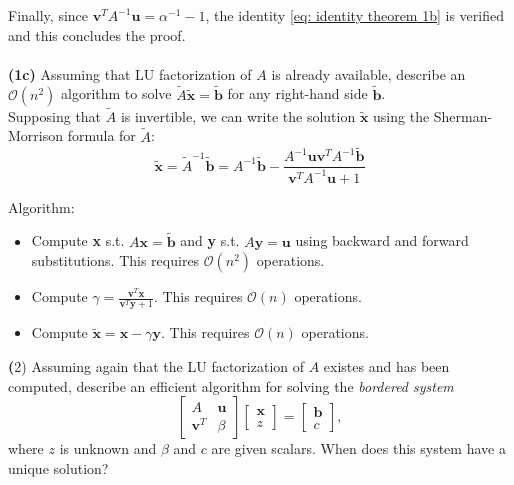 \documentclass[a4paper]{report}
\numberwithin{equation}{chapter}
\begin{document}
Finally, since $\textbf{v}^T A^{-1} \textbf{u} = \alpha^{-1} - 1$, the identity \eqref{eq: identity theorem 1b} is verified and this concludes the proof.\\
\\
\textbf{(1c)} Assuming that LU factorization of $A$ is already available, describe an $\mathcal{O}(n^2)$ algorithm to solve $\tilde{A} \tilde{\textbf{x}} = \tilde{\textbf{b}}$ for any right-hand side $\tilde{\textbf{b}}$.\\
Supposing that $\tilde{A}$ is invertible, we can write the solution $\tilde{\textbf{x}}$ using the Sherman-Morrison formula for $\tilde{A}$:
\begin{equation}\label{key}
	\tilde{\textbf{x}} = \tilde{A}^{-1} \tilde{\textbf{b}} =  A^{-1} \tilde{\textbf{b}}  - \frac{A^{-1}\textbf{u}\textbf{v}^T A^{-1}\tilde{\textbf{b}} }{\textbf{v}^T A^{-1} \textbf{u} + 1 }
\end{equation}

\noindent Algorithm: 
\begin{itemize}
	\item Compute \textbf{x} s.t. $A\textbf{x} = \tilde{\textbf{b}}$ and \textbf{y} s.t. $A\textbf{y} = \textbf{u}$ using backward and forward substitutions. This requires $\mathcal{O}(n^2)$ operations.
	\item Compute $\gamma = \frac{\textbf{v}^T \textbf{x}}{\textbf{v}^T \textbf{y} + 1}$. This requires $\mathcal{O}(n)$ operations.
	\item Compute $\tilde{\textbf{x}} = \textbf{x} - \gamma \textbf{y}$. This requires $\mathcal{O}(n)$ operations.
\end{itemize}


\noindent \textbf({2)} Assuming again that the LU factorization of $A$ existes and has been computed, describe an efficient algorithm for solving the \textit{bordered system}
\begin{equation}\label{key}
\begin{bmatrix}
	A &  \textbf{u} \\ 
	\textbf{v}^T & \beta 
\end{bmatrix}
\begin{bmatrix}
\textbf{x} \\ 
z
\end{bmatrix}
=
\begin{bmatrix}
	\textbf{b} \\ 
	c
\end{bmatrix},
\end{equation}
where $z$ is unknown and $\beta$ and $c$ are given scalars. When does this system have a unique solution?
\end{document}
